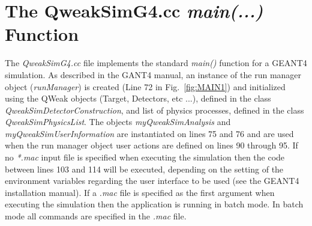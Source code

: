\chapter{The QweakSimG4.cc {\em main(...)} Function}\label{CHP_III}

The {\em QweakSimG4.cc} file implements the standard {\em main()}
function for a GEANT4 simulation. As described in the GANT4 manual, an
instance of the run manager object ({\em runManager}) is created (Line
72 in Fig.~\ref{fig:MAIN1}) and initialized using the QWeak objects
(Target, Detectors, etc ...), defined in the class {\em
QweakSimDetectorConstruction}, and list of physics processes, defined
in the class {\em QweakSimPhysicsList}. The objects {\em
myQweakSimAnalysis} and {\em myQweakSimUserInformation} are
instantiated on lines 75 and 76 and are used when the run manager
object user actions are defined on lines 90 through 95. If no {\em
*.mac} input file is specified when executing the simulation then the
code between lines 103 and 114 will be executed, depending on the
setting of the environment variables regarding the user interface to
be used (see the GEANT4 installation manual). If a {\em *.mac} file is
specified as the first argument when executing the simulation then the
application is running in batch mode.  In \label{batchIII} batch mode all
commands are specified in the {\em *.mac} file.

